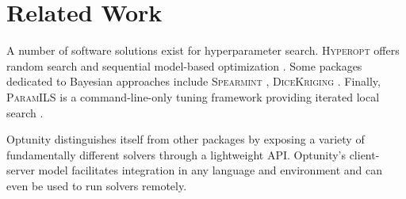 \documentclass[twoside,11pt]{article}
\newcommand{\optunity}{{\sc Optunity}\xspace}
\begin{document}
\section{Related Work}

A number of software solutions exist for hyperparameter search. \textsc{Hyperopt} offers random search and sequential model-based optimization \citep{bergstra2013hyperopt}. Some packages dedicated to Bayesian approaches include \textsc{Spearmint} \citep{snoek2012practical}, \textsc{DiceKriging} \citep{roustant2012dicekriging}. Finally, \textsc{ParamILS} is a command-line-only tuning framework providing iterated local search \citep{hutter2009paramils}. 

\optunity distinguishes itself from other packages by exposing a variety of fundamentally different solvers through a lightweight API. \optunity's client-server model facilitates integration in any language and environment and can even be used to run solvers remotely.

\ifx
\end{document}
